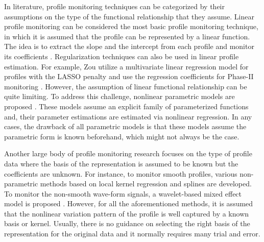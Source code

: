\documentclass{scrartcl}
\theoremstyle{definition}
\begin{document}
In literature, profile monitoring techniques can be categorized by their assumptions on the type of the functional relationship that they assume.
Linear profile monitoring can be considered the most basic profile monitoring technique, in which it is assumed that the profile can be represented by a  linear function. The idea is to extract the slope and the intercept from each profile and monitor its coefficients \parencite{zhu2009monitoring}. 
Regularization techniques can also be used in linear profile estimation. For example, Zou \etal utilize a multivariate linear regression model for profiles with the LASSO penalty and use the regression coefficients for Phase-II monitoring \parencite{zou2012lasso}.
However, the assumption of linear functional relationship can be quite limiting.
To address this challenge, nonlinear parametric models are proposed \parencite{Williams2007-ty,Jensen2009-tu,Noorossana2011-oj,Maleki2018-uo}.
These models assume an explicit family of parameterized functions and, their parameter estimations are estimated via nonlinear regression. In any cases, the drawback of all parametric models is that these models assume the parametric form is known beforehand, which might not always be the case.

Another large body of profile monitoring research focuses on the type of profile data where the basis of the representation is assumed to be known but the coefficients are unknown. 
For instance, to monitor smooth profiles, various non-parametric methods based on local kernel regression \parencite{zou2008monitoring,qiu2010nonparametric,zou2009nonparametric} and splines \parencite{chang2010statistical} are developed. 
To monitor the non-smooth wave-form signals, a wavelet-based mixed effect model is proposed
\parencite{paynabar2011characterization}. 
However, for all the aforementioned methods, it is assumed that the nonlinear variation pattern of the profile is well captured by a known basis or kernel.
Usually, there is no guidance on selecting the right basis of the representation for the original data and it normally requires many trial and error. 
\end{document}
